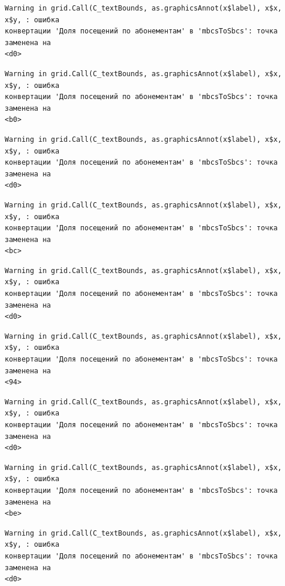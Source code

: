\documentclass[
  letterpaper,
  DIV=11,
  numbers=noendperiod]{scrreprt}
\begin{document}
\begin{verbatim}
Warning in grid.Call(C_textBounds, as.graphicsAnnot(x$label), x$x, x$y, : ошибка
конвертации 'Доля посещений по абонементам' в 'mbcsToSbcs': точка заменена на
<d0>
\end{verbatim}

\begin{verbatim}
Warning in grid.Call(C_textBounds, as.graphicsAnnot(x$label), x$x, x$y, : ошибка
конвертации 'Доля посещений по абонементам' в 'mbcsToSbcs': точка заменена на
<b0>
\end{verbatim}

\begin{verbatim}
Warning in grid.Call(C_textBounds, as.graphicsAnnot(x$label), x$x, x$y, : ошибка
конвертации 'Доля посещений по абонементам' в 'mbcsToSbcs': точка заменена на
<d0>
\end{verbatim}

\begin{verbatim}
Warning in grid.Call(C_textBounds, as.graphicsAnnot(x$label), x$x, x$y, : ошибка
конвертации 'Доля посещений по абонементам' в 'mbcsToSbcs': точка заменена на
<bc>
\end{verbatim}

\begin{verbatim}
Warning in grid.Call(C_textBounds, as.graphicsAnnot(x$label), x$x, x$y, : ошибка
конвертации 'Доля посещений по абонементам' в 'mbcsToSbcs': точка заменена на
<d0>
\end{verbatim}

\begin{verbatim}
Warning in grid.Call(C_textBounds, as.graphicsAnnot(x$label), x$x, x$y, : ошибка
конвертации 'Доля посещений по абонементам' в 'mbcsToSbcs': точка заменена на
<94>
\end{verbatim}

\begin{verbatim}
Warning in grid.Call(C_textBounds, as.graphicsAnnot(x$label), x$x, x$y, : ошибка
конвертации 'Доля посещений по абонементам' в 'mbcsToSbcs': точка заменена на
<d0>
\end{verbatim}

\begin{verbatim}
Warning in grid.Call(C_textBounds, as.graphicsAnnot(x$label), x$x, x$y, : ошибка
конвертации 'Доля посещений по абонементам' в 'mbcsToSbcs': точка заменена на
<be>
\end{verbatim}

\begin{verbatim}
Warning in grid.Call(C_textBounds, as.graphicsAnnot(x$label), x$x, x$y, : ошибка
конвертации 'Доля посещений по абонементам' в 'mbcsToSbcs': точка заменена на
<d0>
\end{verbatim}
\end{document}
